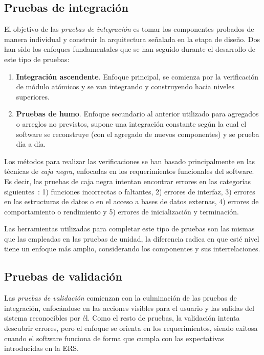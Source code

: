\subsection{Pruebas de integración}

El objetivo de las \emph{pruebas de integración} es tomar los componentes probados de manera individual y construir la arquitectura señalada en la etapa de diseño. Dos han sido los enfoques fundamentales que se han seguido durante el desarrollo de este tipo de pruebas:

\begin{enumerate}
	\item \textbf{Integración ascendente}. Enfoque principal, se comienza por la verificación de módulo atómicos y se van integrando y construyendo hacia niveles superiores.
	\item \textbf{Pruebas de humo}. Enfoque secundario al anterior utilizado para agregados o arreglos no previstos, supone una integración constante según la cual el software se reconstruye (con el agregado de nuevos componentes) y se prueba día a día.
\end{enumerate}

Los métodos para realizar las verificaciones se han basado principalmente en las técnicas de \emph{caja negra}, enfocadas en los requerimientos funcionales del software. Es decir, las pruebas de caja negra intentan encontrar errores en las categorías siguientes~\cite{Pre10}: 1) funciones incorrectas o faltantes, 2) errores de interfaz, 3) errores en las estructuras de datos o en el acceso a bases de datos externas, 4) errores de comportamiento o rendimiento y 5) errores de inicialización y terminación.

Las herramientas utilizadas para completar este tipo de pruebas son las mismas que las empleadas en las pruebas de unidad, la diferencia radica en que esté nivel tiene un enfoque más amplio, considerando los componentes y sus interrelaciones.

\subsection{Pruebas de validación}
\label{subsec:pruebasValidacion}

Las \emph{pruebas de validación} comienzan con la culminación de las pruebas de integración, enfocándose en las acciones visibles para el usuario y las salidas del sistema reconocibles por él. Como el resto de pruebas, la validación intenta descubrir errores, pero el enfoque se orienta en los requerimientos, siendo exitosa cuando el software funciona de forma que cumpla con las expectativas introducidas en la ERS.

